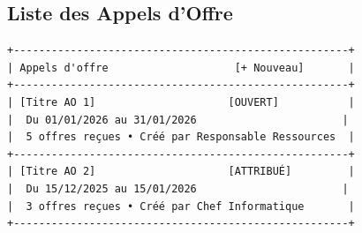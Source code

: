 \subsection{Liste des Appels d'Offre}

\begin{verbatim}
+-----------------------------------------------------+
| Appels d'offre                    [+ Nouveau]       |
+-----------------------------------------------------+
| [Titre AO 1]                     [OUVERT]           |
|  Du 01/01/2026 au 31/01/2026                       |
|  5 offres reçues • Créé par Responsable Ressources  |
+-----------------------------------------------------+
| [Titre AO 2]                     [ATTRIBUÉ]         |
|  Du 15/12/2025 au 15/01/2026                       |
|  3 offres reçues • Créé par Chef Informatique       |
+-----------------------------------------------------+
\end{verbatim}
